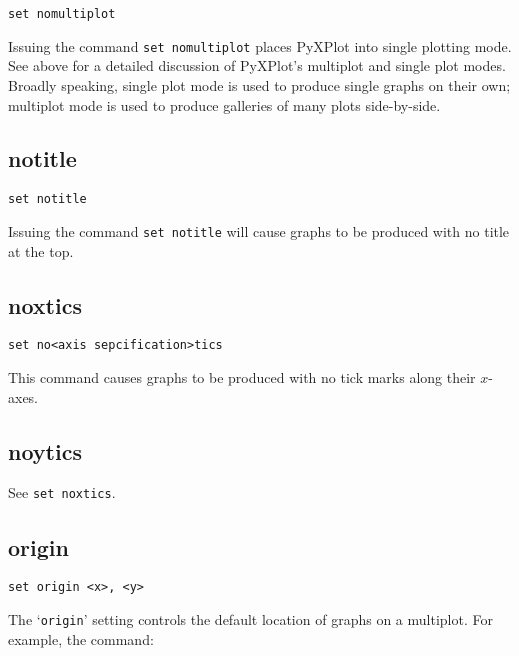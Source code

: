\documentclass[a4paper,onecolumn,11pt]{book}
\begin{document}
\begin{verbatim}
set nomultiplot
\end{verbatim}

Issuing the command {\tt set nomultiplot} places PyXPlot into single plotting
mode.  See above for a detailed discussion of PyXPlot's multiplot and
single plot modes. Broadly speaking, single plot mode is used to produce single
graphs on their own; multiplot mode is used to produce galleries of many plots
side-by-side.


\subsection{notitle}

\begin{verbatim}
set notitle
\end{verbatim}

Issuing the command {\tt set notitle} will cause graphs to be produced with no
title at the top.


\subsection{noxtics}

\begin{verbatim}
set no<axis sepcification>tics
\end{verbatim}

This command causes graphs to be produced with no tick marks along their $x$-axes.

\subsection{noytics}

See {\tt set noxtics}.


\subsection{origin}

\begin{verbatim}
set origin <x>, <y>
\end{verbatim}

The `{\tt origin}' setting controls the default location of graphs on a multiplot.
For example, the command:
\end{document}
